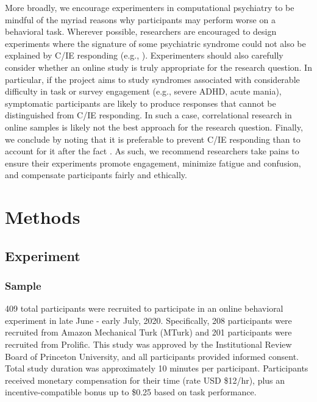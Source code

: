 \documentclass[a4paper,notitlepage,12pt]{article}
\begin{document}
More broadly, we encourage experimenters in computational psychiatry to be mindful of the myriad reasons why participants may perform worse on a behavioral task. Wherever possible, researchers are encouraged to design experiments where the signature of some psychiatric syndrome could not also be explained by C/IE responding (e.g., \cite{eldar2015interaction, hunter2022increased}). Experimenters should also carefully consider whether an online study is truly appropriate for the research question. In particular, if the project aims to study syndromes associated with considerable difficulty in task or survey engagement (e.g., severe ADHD, acute mania), symptomatic participants are likely to produce responses that cannot be distinguished from C/IE responding. In such a case, correlational research in online samples is likely not the best approach for the research question. Finally, we conclude by noting that it is preferable to prevent C/IE responding than to account for it after the fact \cite{ward2018applying}. As such, we recommend researchers take pains to ensure their experiments promote engagement, minimize fatigue and confusion, and compensate participants fairly and ethically.

\section*{Methods}

\subsection*{Experiment}

\subsubsection*{Sample}

409 total participants were recruited to participate in an online behavioral experiment in late June - early July, 2020. Specifically, 208 participants were recruited from Amazon Mechanical Turk (MTurk) and 201 participants were recruited from Prolific. This study was approved by the Institutional Review Board of Princeton University, and all participants provided informed consent. Total study duration was approximately 10 minutes per participant. Participants received monetary compensation for their time (rate USD \$12/hr), plus an incentive-compatible bonus up to \$0.25 based on task performance. 
\end{document}
